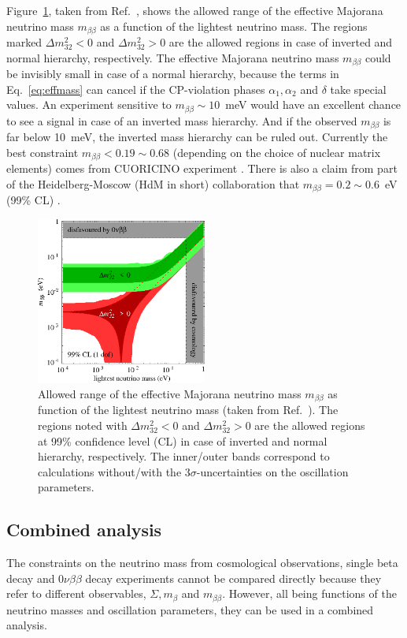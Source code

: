 Figure~\ref{fig:m2bVSlightest}, taken from Ref.~\cite{Str05}, shows the allowed range of the effective Majorana neutrino mass $m_{\beta\beta}$ as a function of the lightest neutrino mass. The regions marked $\Delta m^{2}_{32}<0$ and $\Delta m^{2}_{32}>0$ are the allowed regions in case of inverted and normal hierarchy, respectively. The effective Majorana neutrino mass $m_{\beta\beta}$ could be invisibly small in case of a normal hierarchy, because the terms in Eq.~\ref{eq:effmass} can cancel if the CP-violation phases $\alpha_{1}, \alpha_{2}$ and $\delta$ take special values. An experiment sensitive to $ m_{\beta\beta} \sim 10$~meV would have an excellent chance to see a signal in case of an inverted mass hierarchy. And if the observed $m_{\beta\beta}$ is far below 10~meV, the inverted mass hierarchy can be ruled out. Currently the best constraint $m_{\beta\beta}<0.19 \sim 0.68$ (depending on the choice of nuclear matrix elements) comes from CUORICINO experiment \cite{Cuo08}. There is also a claim from part of the Heidelberg-Moscow (HdM in short) collaboration that $m_{\beta\beta} = 0.2 \sim 0.6$~eV (99\% CL) \cite{Hei04}.
\begin{figure}[tbhp]
\centering
\includegraphics[width=0.5\textwidth]{m2bVSlightest}  
\caption{Allowed range of the effective Majorana neutrino mass $m_{\beta\beta}$ as function of the lightest neutrino mass (taken from Ref.~\cite{Str05}). The regions noted with $\Delta m^{2}_{32}<0$ and $\Delta m^{2}_{32}>0$ are the allowed regions at 99\% confidence level (CL) in case of inverted and normal hierarchy, respectively. The
inner/outer bands correspond to calculations without/with the $3 \sigma$-uncertainties on the oscillation parameters.}
\label{fig:m2bVSlightest}
\end{figure}

\subsection{Combined analysis}
\label{sec:joian}
The constraints on the neutrino mass from cosmological observations, single beta decay and $0\nu\beta\beta$ decay experiments cannot be compared directly because they refer to different observables, $\Sigma, m_{\beta}$ and $m_{\beta\beta}$. However, all being functions of the neutrino masses and oscillation parameters, they can be used in a combined analysis. 

